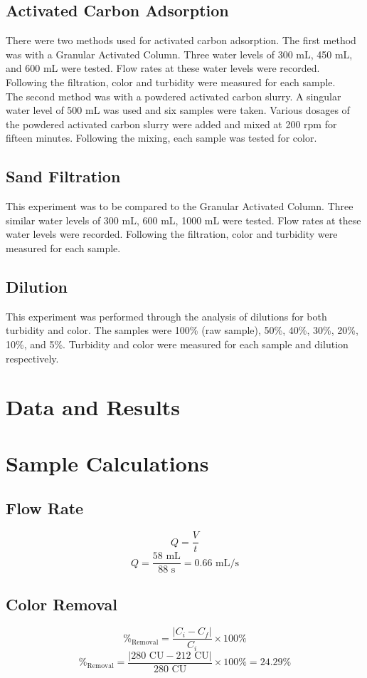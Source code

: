 \documentclass{article}
\begin{document}
    \subsection{Activated Carbon Adsorption}
    \indent There were two methods used for activated carbon adsorption. The first method was with a Granular Activated Column. Three water levels of 300 mL, 450 mL, and 600 mL were tested. Flow rates at these water levels were recorded. Following the filtration, color and turbidity were measured for each sample.\\
    \indent The second method was with a powdered activated carbon slurry. A singular water level of 500 mL was used and six samples were taken. Various dosages of the powdered activated carbon slurry were added and mixed at 200 rpm for fifteen minutes. Following the mixing, each sample was tested for color.
    \subsection{Sand Filtration}
    \indent This experiment was to be compared to the Granular Activated Column. Three similar water levels of 300 mL, 600 mL, 1000 mL were tested. Flow rates at these water levels were recorded. Following the filtration, color and turbidity were measured for each sample.
    \subsection{Dilution}
    This experiment was performed through the analysis of dilutions for both turbidity and color. The samples were 100\% (raw sample), 50\%, 40\%, 30\%, 20\%, 10\%, and 5\%. Turbidity and color were measured for each sample and dilution respectively.
    \newpage
    \section{Data and Results}
    
    \newpage
    \section{Sample Calculations}
    \subsection{Flow Rate}
    \[Q=\frac{V}{t}\]
    \[Q=\frac{58\text{ mL}}{88\text{ s}}=\boxed{0.66 \text{ mL/s}}\]
    \subsection{Color Removal}
    \[\%_\text{Removal}=\frac{|C_i-C_f|}{C_i}\times 100\%\]
    \[\%_\text{Removal}=\frac{|\text{280 CU}-\text{212 CU}|}{\text{280 CU}}\times 100\%=\boxed{24.29\%}\]
\end{document}
